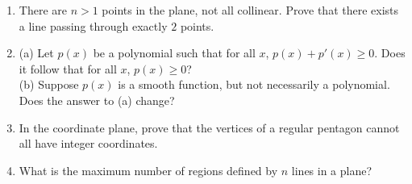 \documentclass[12pt]{article}
\begin{document}
\begin{enumerate}
	\item{There are $n>1$ points in the plane, not all collinear. Prove that there exists a line passing through exactly $2$ points.}
	
	\item{(a) Let $p(x)$ be a polynomial such that for all $x$, $p(x) + p'(x) \ge 0$. Does it follow that for all $x$, $p(x) \ge 0$? 
\\(b) Suppose $p(x)$ is a smooth function, but not necessarily a polynomial. Does the answer to (a) change?}
	
	
	
	\item{In the coordinate plane, prove that the vertices of a regular pentagon cannot all have integer coordinates.}

	\item{What is the maximum number of regions defined by $n$ lines in a plane?}
	





\end{enumerate}
\end{document}
